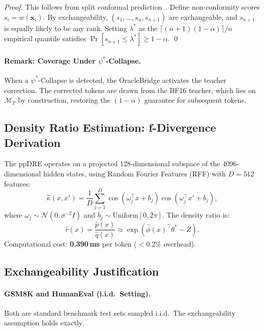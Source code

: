 \documentclass[runningheads]{article} %
\begin{document}
\begin{proof}
This follows from split conformal prediction~\cite{angelopoulos2022conformal}.
Define non-conformity scores $s_i = w(\mathbf{x}_i)$.
By exchangeability, $(s_1, \ldots, s_n, s_{n+1})$ are exchangeable,
and $s_{n+1}$ is equally likely to be any rank.
Setting $\lambda^*$ as the
$\lceil(n+1)(1-\alpha)\rceil / n$ empirical quantile satisfies
$\Pr[s_{n+1} \leq \lambda^*] \geq 1 - \alpha$. \qed
\end{proof}

\paragraph{Remark: Coverage Under $\psi^*$-Collapse.}
When a $\psi^*$-Collapse is detected, the OracleBridge activates
the teacher correction. The corrected tokens are drawn from the
BF16 teacher, which lies on $\mathcal{M}_T$ by construction,
restoring the $(1-\alpha)$ guarantee for subsequent tokens.

\subsection{Density Ratio Estimation: f-Divergence Derivation}

The ppDRE operates on a projected 128-dimensional subspace of the
4096-dimensional hidden states, using Random Fourier Features (RFF)
with $D=512$ features:
\begin{equation}
  \hat{\kappa}(x, x') = \frac{1}{D} \sum_{j=1}^{D}
    \cos(\omega_j^\top x + b_j) \cos(\omega_j^\top x' + b_j),
\end{equation}
where $\omega_j \sim \mathcal{N}(0, \sigma^{-2} I)$ and
$b_j \sim \text{Uniform}[0, 2\pi]$.
The density ratio is:
\begin{equation}
  \hat{r}(x) = \frac{\hat{p}(x)}{\hat{q}(x)} \approx
    \exp\!\left(\hat{\phi}(x)^\top \theta^* - Z\right).
\end{equation}
Computational cost: \textbf{0.390\,ms} per token ($<0.2\%$ overhead).

\subsection{Exchangeability Justification}

\paragraph{GSM8K and HumanEval (i.i.d.\ Setting).}
Both are standard benchmark test sets sampled i.i.d.\
The exchangeability assumption holds exactly.
\end{document}
